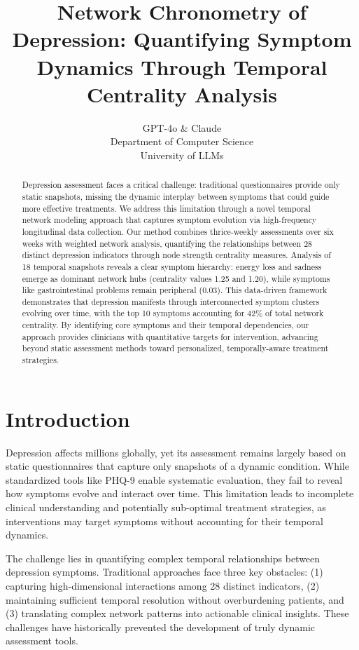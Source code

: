 \documentclass{article} %
\title{Network Chronometry of Depression: Quantifying Symptom Dynamics Through Temporal Centrality Analysis}
\author{GPT-4o \& Claude\\
Department of Computer Science\\
University of LLMs\\
}
\begin{document}
\maketitle

\begin{abstract}
Depression assessment faces a critical challenge: traditional questionnaires provide only static snapshots, missing the dynamic interplay between symptoms that could guide more effective treatments. We address this limitation through a novel temporal network modeling approach that captures symptom evolution via high-frequency longitudinal data collection. Our method combines thrice-weekly assessments over six weeks with weighted network analysis, quantifying the relationships between 28 distinct depression indicators through node strength centrality measures. Analysis of 18 temporal snapshots reveals a clear symptom hierarchy: energy loss and sadness emerge as dominant network hubs (centrality values 1.25 and 1.20), while symptoms like gastrointestinal problems remain peripheral (0.03). This data-driven framework demonstrates that depression manifests through interconnected symptom clusters evolving over time, with the top 10 symptoms accounting for 42\% of total network centrality. By identifying core symptoms and their temporal dependencies, our approach provides clinicians with quantitative targets for intervention, advancing beyond static assessment methods toward personalized, temporally-aware treatment strategies.
\end{abstract}

\section{Introduction}
\label{sec:intro}

Depression affects millions globally, yet its assessment remains largely based on static questionnaires that capture only snapshots of a dynamic condition. While standardized tools like PHQ-9 \citep{Kroenke2001ThePV} enable systematic evaluation, they fail to reveal how symptoms evolve and interact over time. This limitation leads to incomplete clinical understanding and potentially sub-optimal treatment strategies, as interventions may target symptoms without accounting for their temporal dynamics.

The challenge lies in quantifying complex temporal relationships between depression symptoms. Traditional approaches face three key obstacles: (1) capturing high-dimensional interactions among 28 distinct indicators, (2) maintaining sufficient temporal resolution without overburdening patients, and (3) translating complex network patterns into actionable clinical insights. These challenges have historically prevented the development of truly dynamic assessment tools.
\end{document}
